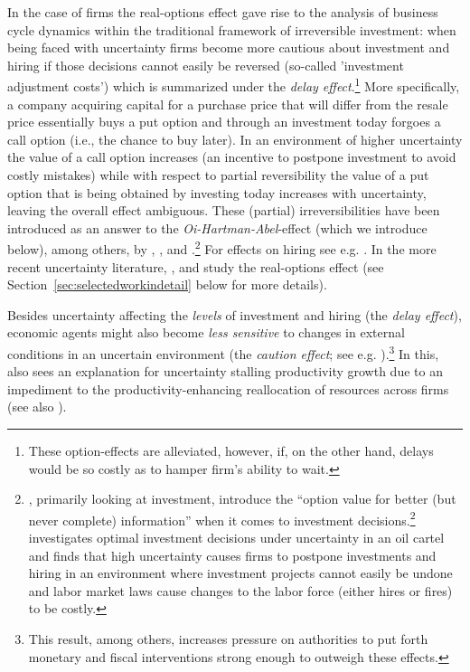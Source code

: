 \documentclass[a4paper,11pt,listof=nochaptergap,oneside,pointednumbers,bibtotoc,bigheadings,liststotoc,hidelinks]{scrbook}
\theoremstyle{mysatz}
\theoremstyle{mydefinition}
\theoremstyle{mytheorem}
\theoremstyle{mybemerkung}
\begin{document}
In the case of firms the real-options effect gave rise to the analysis of business cycle dynamics within the traditional framework of irreversible investment: when being faced with uncertainty firms become more cautious about investment and hiring if those decisions cannot easily be reversed (so-called 'investment adjustment costs') which is summarized under the \textit{delay effect}.\footnote{These option-effects are alleviated, however, if, on the other hand, delays would be so costly as to hamper firm's ability to wait.} More specifically, a company acquiring capital for a purchase price that will differ from the resale price essentially buys a put option and through an investment today forgoes a call option (i.e., the chance to buy later). In an environment of higher uncertainty the value of a call option increases (an incentive to postpone investment to avoid costly mistakes) while with respect to partial reversibility the value of a put option that is being obtained by investing today increases with uncertainty, leaving the overall effect ambiguous. These (partial) irreversibilities have been introduced as an answer to the \textit{Oi-Hartman-Abel}-effect (which we introduce below), among others, by \citet{dixitandpindyck:94}, \citet{bernanke:83}, \citet{abelandeberly:96} and \citet{siegel:86}.\footnote{\citet{dixitandpindyck:94}, primarily looking at investment, introduce the ``option value for better (but never complete) information'' when it comes to investment decisions.\footnote{In fact, the term 'options-effect' in this context borrows from an analogy of option theory in finance.} \citet{bernanke:83} investigates optimal investment decisions under uncertainty in an oil cartel and finds that high uncertainty causes firms to postpone investments and hiring in an environment where investment projects cannot easily be undone and labor market laws cause changes to the labor force (either hires or fires) to be costly.} For effects on hiring see e.g. \citet{bentoliliaandbertola:90} . In the more recent uncertainty literature, \citet{bloom:09}, \citet{bloometal:12} and \citet{schaal:17} study the real-options effect (see Section~\ref{sec:selectedworkindetail} below for more details).

Besides uncertainty affecting the \textit{levels} of investment and hiring (the \textit{delay effect}), economic agents might also become \textit{less sensitive} to changes in external conditions in an uncertain environment (the \textit{caution effect}; see e.g. \citealp{bloom:09}).\footnote{This result, among others, increases pressure on authorities to put forth monetary and fiscal interventions strong enough to outweigh these effects.} In this, \citet{bloom:14} also sees an explanation for uncertainty stalling productivity growth due to an impediment to the productivity-enhancing reallocation of resources across firms (see also \citealp{bloometal:12}).\\
\end{document}

